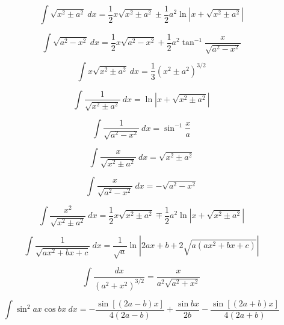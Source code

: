 \begin{equation*}
\int\sqrt{x^2 \pm a^2}\ dx = \frac{1}{2}x\sqrt{x^2\pm a^2} 
\pm\frac{1}{2}a^2 \ln \left | x + \sqrt{x^2\pm a^2} \right | 
\end{equation*}

\begin{equation*}
\int  \sqrt{a^2 - x^2}\ dx = \frac{1}{2} x \sqrt{a^2-x^2} 
+\frac{1}{2}a^2\tan^{-1}\frac{x}{\sqrt{a^2-x^2}}
\end{equation*}

\begin{equation*}
\int  x \sqrt{x^2 \pm a^2}\ dx= \frac{1}{3}\left ( x^2 \pm a^2 \right)^{3/2} 
\end{equation*}

\begin{equation*}
\int \frac{1}{\sqrt{x^2 \pm a^2}}\ dx = \ln \left | x + \sqrt{x^2 \pm a^2} \right | 
\end{equation*}

\begin{equation*}
\int \frac{1}{\sqrt{a^2 - x^2}}\ dx = \sin^{-1}\frac{x}{a} 
\end{equation*}

\begin{equation*}
\int \frac{x}{\sqrt{x^2\pm a^2}}\ dx = \sqrt{x^2 \pm a^2} 
\end{equation*}

\begin{equation*}
\int \frac{x}{\sqrt{a^2-x^2}}\ dx = -\sqrt{a^2-x^2} 
\end{equation*}

\begin{equation*}\label{eq:Russ}
\int \frac{x^2}{\sqrt{x^2 \pm a^2}}\ dx = \frac{1}{2}x\sqrt{x^2 \pm a^2}
\mp \frac{1}{2}a^2 \ln \left| x + \sqrt{x^2\pm a^2} \right | 
\end{equation*}

\begin{equation*}
\int\frac{1}{\sqrt{ax^2+bx+c}}\ dx=
\frac{1}{\sqrt{a}}\ln \left| 2ax+b + 2 \sqrt{a(ax^2+bx+c)} \right | 
\end{equation*}

\begin{equation*}\label{eq:Winokur2}
\int\frac{dx}{(a^2+x^2)^{3/2}}=\frac{x}{a^2\sqrt{a^2+x^2}}
\end{equation*}

\begin{equation*}
\int \sin^2 ax \cos bx\ dx = 
-\frac{\sin[(2a-b)x]}{4(2a-b)} 
+ \frac{\sin bx}{2b} 
- \frac{\sin[(2a+b)x]}{4(2a+b)}
\end{equation*}

